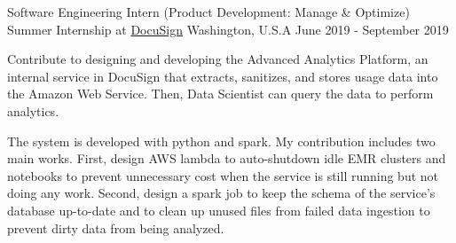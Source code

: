 \begin{cventries}
  \cventry
    {Software Engineering Intern (Product Development: Manage \& Optimize)} %
    {Summer Internship at \href{https://www.docusign.com/}{DocuSign}} %
    {Washington, U.S.A} %
    {June 2019 - September 2019} %
    {
      \begin{cvitems} %
        \item {
          Contribute to designing and developing the Advanced Analytics Platform, an internal service in DocuSign that extracts, sanitizes, and stores usage data into the Amazon Web Service.
          Then, Data Scientist can query the data to perform analytics.
        }
        \item {
          The system is developed with python and spark. My contribution includes two main works.
          First, design AWS lambda to auto-shutdown idle EMR clusters and notebooks to prevent unnecessary cost when the service is still running but not doing any work.
          Second, design a spark job to keep the schema of the service's database up-to-date and to clean up unused files from failed data ingestion to prevent dirty data from being analyzed.
        }
      \end{cvitems}
    }


\end{cventries}
